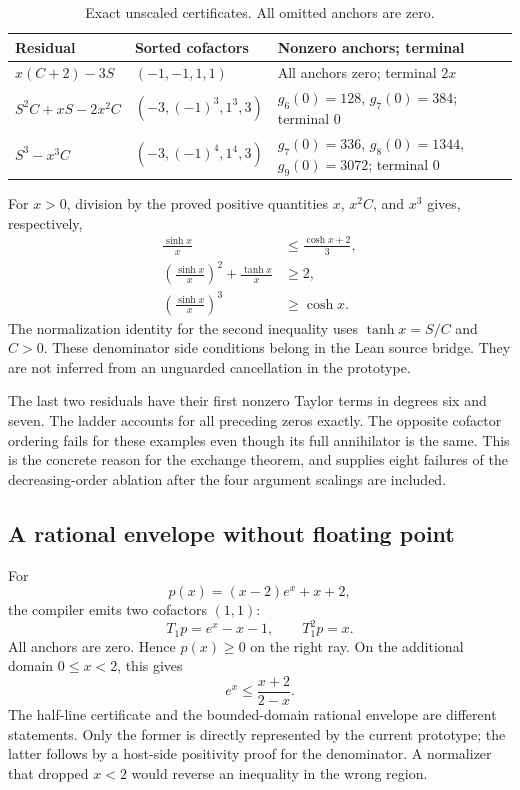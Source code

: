 \begin{table}[ht]
\centering\small
\begin{tabularx}{\textwidth}{@{}p{}p{}X@{}}
\toprule
Residual & Sorted cofactors & Nonzero anchors; terminal\\
\midrule
$x(C+2)-3S$ & $(-1,-1,1,1)$ & All anchors zero; terminal $2x$\\
$S^2C+xS-2x^2C$ & $(-3,(-1)^3,1^3,3)$ & $g_6(0)=128$, $g_7(0)=384$; terminal $0$\\
$S^3-x^3C$ & $(-3,(-1)^4,1^4,3)$ & $g_7(0)=336$, $g_8(0)=1344$, $g_9(0)=3072$; terminal $0$\\
\bottomrule
\end{tabularx}
\caption{Exact unscaled certificates. All omitted anchors are zero.}
\label{tab:hyperbolic}
\end{table}

For $x>0$, division by the proved positive quantities $x$, $x^2C$, and $x^3$ gives, respectively,
\begin{align*}
 \frac{\sinh x}{x}&\le\frac{\cosh x+2}{3},\\
 \left(\frac{\sinh x}{x}\right)^2+\frac{\tanh x}{x}&\ge2,\\
 \left(\frac{\sinh x}{x}\right)^3&\ge\cosh x.
\end{align*}
The normalization identity for the second inequality uses $\tanh x=S/C$ and $C>0$. These denominator side conditions belong in the Lean source bridge. They are not inferred from an unguarded cancellation in the prototype.

The last two residuals have their first nonzero Taylor terms in degrees six and seven. The ladder accounts for all preceding zeros exactly. The opposite cofactor ordering fails for these examples even though its full annihilator is the same. This is the concrete reason for the exchange theorem, and supplies eight failures of the decreasing-order ablation after the four argument scalings are included.

\subsection{A rational envelope without floating point}

For
\[
 p(x)=(x-2)e^x+x+2,
\]
the compiler emits two cofactors $(1,1)$:
\[
 T_1p=e^x-x-1,\qquad T_1^2p=x.
\]
All anchors are zero. Hence $p(x)\ge0$ on the right ray. On the additional domain $0\le x<2$, this gives
\[
 e^x\le\frac{x+2}{2-x}.
\]
The half-line certificate and the bounded-domain rational envelope are different statements. Only the former is directly represented by the current prototype; the latter follows by a host-side positivity proof for the denominator. A normalizer that dropped $x<2$ would reverse an inequality in the wrong region.

